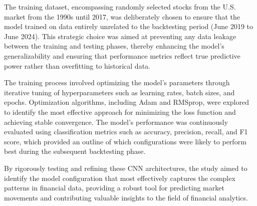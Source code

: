 The training dataset, encompassing randomly selected stocks from the U.S. market from the 1990s until 2017, was deliberately chosen to ensure that the model trained on data entirely unrelated to the backtesting period (June 2019 to June 2024). This strategic choice was aimed at preventing any data leakage between the training and testing phases, thereby enhancing the model's generalizability and ensuring that performance metrics reflect true predictive power rather than overfitting to historical data.

The training process involved optimizing the model's parameters through iterative tuning of hyperparameters such as learning rates, batch sizes, and epochs. Optimization algorithms, including Adam and RMSprop, were explored to identify the most effective approach for minimizing the loss function and achieving stable convergence. The model's performance was continuously evaluated using classification metrics such as accuracy, precision, recall, and F1 score, which provided an outline of which configurations were likely to perform best during the subsequent backtesting phase.

By rigorously testing and refining these CNN architectures, the study aimed to identify the model configuration that most effectively captures the complex patterns in financial data, providing a robust tool for predicting market movements and contributing valuable insights to the field of financial analytics.